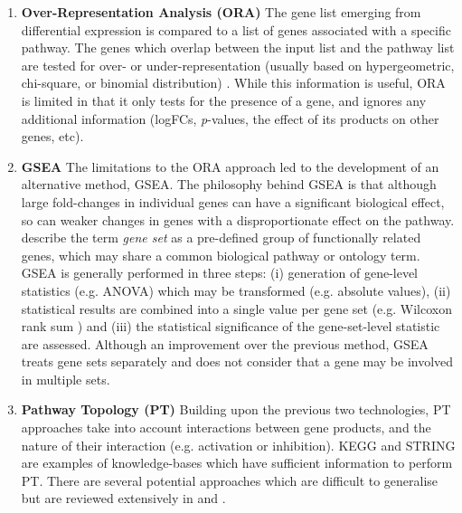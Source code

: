 \begin{enumerate}
\item[] \textbf{Over-Representation Analysis (ORA)} \hspace{0.15cm} The gene list emerging from differential expression is compared to a list of genes associated with a specific pathway. The genes which overlap between the input list and the pathway list are tested for over- or under-representation (usually based on hypergeometric, chi-square, or binomial distribution) \citep{khatri2012ten}. While this information is useful, ORA is limited in that it only tests for the presence of a gene, and ignores any additional information (\ac{logFC}s, \textit{p}-values, the effect of its products on other genes, etc).

\item[] \textbf{\ac{GSEA}} \hspace{0.15cm} The limitations to the ORA approach led to the development of an alternative method, GSEA. The philosophy behind GSEA is that although large fold-changes in individual genes can have a significant biological effect, so can weaker changes in genes with a disproportionate effect on the pathway. \cite{luo2009gage} describe the term \textit{gene set} as a pre-defined group of functionally related genes, which may share a common biological pathway or ontology term. \ac{GSEA} is generally performed in three steps: (i) generation of gene-level statistics (e.g. ANOVA) which may be transformed (e.g. absolute values), (ii) statistical results are combined into a single value per gene set (e.g. Wilcoxon rank sum \citep{barry2005significance}) and (iii) the statistical significance of the gene-set-level statistic are assessed. Although an improvement over the previous method, GSEA treats gene sets separately and does not consider that a gene may be involved in multiple sets.

\item[] \textbf{Pathway Topology (PT)} \hspace{0.15cm} Building upon the previous two technologies, PT approaches take into account interactions between gene products, and the nature of their interaction (e.g. activation or inhibition). KEGG and STRING \citep{szklarczyk2019string} are examples of knowledge-bases which have sufficient information to perform PT. There are several potential approaches which are difficult to generalise but are reviewed extensively in \cite{ihnatova2018critical} and \cite{ma2019comparative}.

\end{enumerate} 

